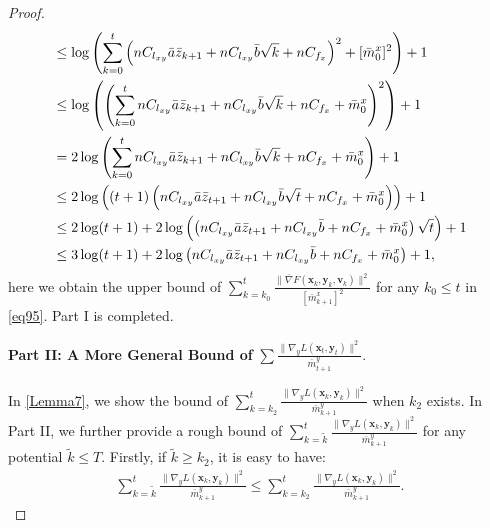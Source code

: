 \documentclass{article}
\theoremstyle{plain}
\theoremstyle{definition}
\theoremstyle{remark}
\begin{document}
\begin{proof}
\begin{align}
&\leq \log \left( \sum_{k=0}^t \left(nC_{l_{xy}} \bar{a} \bar{z}_{k+1} + nC_{l_{xy}} \bar{b} \sqrt{k} + nC_{f_x} \right)^2 + [\bar{m}^x_0]^2 \right) + 1 \notag \\
&\leq \log \left( \left(\sum_{k=0}^t nC_{l_{xy}} \bar{a} \bar{z}_{k+1} +n C_{l_{xy}} \bar{b} \sqrt{k} +nC_{f_x} + \bar{m}^x_0 \right)^2\right) + 1 \notag \\
&=2\log \left( \sum_{k=0}^t nC_{l_{xy}} \bar{a} \bar{z}_{k+1} + nC_{l_{xy}} \bar{b} \sqrt{k} + nC_{f_x} + \bar{m}^x_0 \right) + 1 \notag \\
&\leq 2 \log \left((t+1)\left( nC_{l_{xy}} \bar{a} \bar{z}_{t+1} + nC_{l_{xy}} \bar{b} \sqrt{t} + nC_{f_x} + \bar{m}^x_0 \right)\right) + 1 \notag \\
&\leq 2 \log(t + 1) + 2 \log \left(\left( nC_{l_{xy}} \bar{a} \bar{z}_{t+1} + nC_{l_{xy}} \bar{b} + nC_{f_x} + \bar{m}^x_0 \right)\sqrt{t}\right) + 1 \notag \\
&\leq 3 \log(t + 1) + 2 \log \left( nC_{l_{xy}} \bar{a} \bar{z}_{t+1} + nC_{l_{xy}} \bar{b} + nC_{f_x} +\bar{m}^x_0 \right) + 1,\label{eq95}
\end{align}
here we obtain the upper bound of $\sum_{k=k_0}^t \frac{\| \bar{\nabla} F(\mathbf{x}_{k},\mathbf{y}_{k},\mathbf{v}_{k})\|^2}{[\bar{m}^x_{k+1}]^2}$ for any $k_0 \leq t$ in \cref{eq95}. Part I is completed.

\textbf{Part II: A More General Bound of} $\sum\frac{\|\nabla_y L(\mathbf{x}_t, \mathbf{y}_t)\|^2}{\bar{m}^y_{t+1}}$.

In \cref{Lemma7}, we show the bound of $\sum_{k=k_2}^t \frac{\|\nabla_y L(\mathbf{x}_k, \mathbf{y}_k)\|^2}{\bar{m}^y_{k+1}}$
when $k_2$ exists. In Part II, we further provide a rough bound of $\sum_{k=\tilde{k}}^t \frac{\|\nabla_y L(\mathbf{x}_k, \mathbf{y}_k)\|^2}{\bar{m}^y_{k+1}}$
for any potential $\tilde{k} \leq T$. Firstly, if $\tilde{k} \geq k_2$, it is easy to have:
\begin{align}
\sum_{k=\tilde{k}}^t \frac{\|\nabla_y L(\mathbf{x}_k, \mathbf{y}_k)\|^2}{\bar{m}^y_{k+1}}
\leq \sum_{k=k_2}^t \frac{\|\nabla_y L(\mathbf{x}_k, \mathbf{y}_k)\|^2}{\bar{m}^y_{k+1}}.\label{eq96}
\end{align}


\end{proof}
\end{document}
